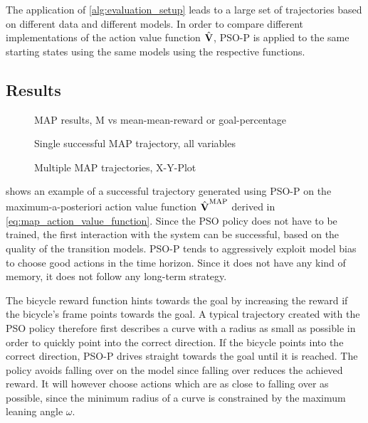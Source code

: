 The application of \cref{alg:evaluation_setup} leads to a large set of trajectories based on different data and different models.
In order to compare different implementations of the action value function $\operatorname{\hat{\operatorname{\mathbf{V}}}}$, PSO-P is applied to the same starting states using the same models using the respective functions.

\subsection{Results}
\begin{figure}[tp]
    \centering
    \caption{MAP results, M vs mean-mean-reward or goal-percentage}
    \label{fig:map_results}
\end{figure}
\begin{figure}[tp]
    \centering
    \caption{Single successful MAP trajectory, all variables}
    \label{fig:map_successful_trajectory}
\end{figure}
\begin{figure}[p]
    \centering
    \caption{Multiple MAP trajectories, X-Y-Plot}
    \label{fig:map_trajectories}
\end{figure}
 shows an example of a successful trajectory generated using PSO-P on the maximum-a-posteriori action value function $\operatorname{\hat{\operatorname{\mathbf{V}}}}^{\text{MAP}}$ derived in \cref{eq:map_action_value_function}.
Since the PSO policy does not have to be trained, the first interaction with the system can be successful, based on the quality of the transition models.
PSO-P tends to aggressively exploit model bias to choose good actions in the time horizon.
Since it does not have any kind of memory, it does not follow any long-term strategy.

The bicycle reward function hints towards the goal by increasing the reward if the bicycle's frame points towards the goal.
A typical trajectory created with the PSO policy therefore first describes a curve with a radius as small as possible in order to quickly point into the correct direction.
If the bicycle points into the correct direction, PSO-P drives straight towards the goal until it is reached.
The policy avoids falling over on the model since falling over reduces the achieved reward.
It will however choose actions which are as close to falling over as possible, since the minimum radius of a curve is constrained by the maximum leaning angle $\omega$.

